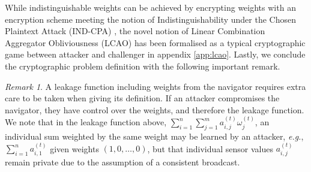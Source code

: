 \documentclass[10pt,letterpaper,oneside,twocolumn,journal]{IEEEtran}
\theoremstyle{definition}
\theoremstyle{definition}
\theoremstyle{remark}
\newtheorem*{remark}{Remark}
\begin{document}
While indistinguishable weights can be achieved by encrypting weights with an encryption scheme meeting the notion of Indistinguishability under the Chosen Plaintext Attack (IND-CPA) \cite{katzIntroductionModernCryptography2008}, the novel notion of Linear Combination Aggregator Obliviousness (LCAO) has been formalised as a typical cryptographic game between attacker and challenger in appendix \ref{app:lcao}. Lastly, we conclude the cryptographic problem definition with the following important remark.
\begin{remark}
    A leakage function including weights from the navigator requires extra care to be taken when giving its definition. If an attacker compromises the navigator, they have control over the weights, and therefore the leakage function. We note that in the leakage function above, $\sum^n_{i=1}\sum^m_{j=1}a^{(t)}_{i,j}\omega^{(t)}_j$, an individual sum weighted by the same weight may be learned by an attacker, \textit{e.g.}, $\sum^n_{i=1}a^{(t)}_{i,1}$ given weights $(1,0,\dots,0)$, but that individual sensor values $a^{(t)}_{i,j}$ remain private due to the assumption of a consistent broadcast.
\end{remark}

% 
% 
\end{document}
